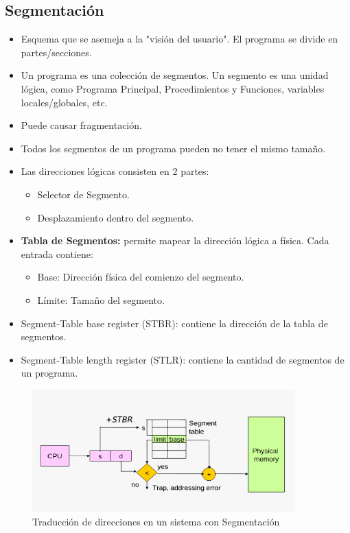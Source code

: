 \subsection{Segmentación}
\begin{itemize}
    \item Esquema que se asemeja a la "visión del usuario". El programa se divide en partes/secciones.
    \item Un programa es una colección de segmentos. Un segmento es una unidad lógica, como Programa Principal, Procedimientos y Funciones, variables locales/globales, etc.
    \item Puede causar fragmentación.
    \item Todos los segmentos de un programa pueden no tener el mismo tamaño.
    \item Las direcciones lógicas consisten en 2 partes:
    \begin{itemize}
        \item Selector de Segmento.
        \item Desplazamiento dentro del segmento. 
    \end{itemize}
    \item \textbf{Tabla de Segmentos:} permite mapear la dirección lógica a física. Cada entrada contiene:
    \begin{itemize}
        \item Base: Dirección física del comienzo del segmento.
        \item Límite: Tamaño del segmento.
    \end{itemize}
    \item Segment-Table base register (STBR): contiene la dirección de la tabla de segmentos.
    \item Segment-Table length register (STLR): contiene la cantidad de segmentos de un programa.
\end{itemize}
\vspace{-0.5cm}
\begin{figure}[h]
    \begin{center}
        \includegraphics[width=0.90\textwidth]{assets/SegmentationTranslation.pdf}
    \end{center}
    \caption{Traducción de direcciones en un sistema con Segmentación}\label{fig:}
\end{figure}
\pagebreak
